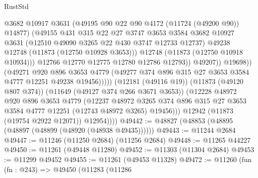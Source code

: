 \begin{lexlean}{RustStd}
\begin{coremodule}
                                  @3682
                                  @10917
                                  @3631
                                  (@49195 @90 @22 @90 @4172 (@11724 (@49200 @90)) @14877)
                                  (@49155
                                    @431
                                    @315
                                    @22
                                    @27
                                    @3747
                                    @3653
                                    @3584
                                    @3682
                                    @10927
                                    @3631
                                    (@12510 @49090 @3265 @22 @430 @3747 @12733 @12737)
                                    @49238
                                    @12748
                                    (@11873 (@12750 @10928 @3653)))
                                  @12748
                                  (@11873 (@12750 @10918 @10934)))
                                @12766
                                @12770
                                @12775
                                @12780
                                @12786
                                @12793))
                            @49207))
                        @19698))
                    (@49271
                      @920
                      @896
                      @3653
                      @4779
                      (@49277 @374 @896 @315 @27 @3653 @3584 @4777 @12251 @49238 @19456)))))
              (@12181 (@49116 @19))
              (@11873 (@49120 @807 @374))
              (@11649 (@49127 @374 @266 @3671 @3653))
              (@12228
                @48972
                @920
                @896
                @3653
                @4779
                (@12237
                  @48972
                  @3265
                  @374
                  @896
                  @315
                  @27
                  @3653
                  @3584
                  @4777
                  @12251
                  (@12743 @48972 @3265)
                  @19456)))
            @12942
            (@11873 (@19754 @2922 @12071))
            @12954))))
@49442 := @48827 (@48853 (@48895 (@48897 (@48899 (@48920 (@48938 @49435))))))
@49443 := @11244 @2684
@49447 := @11246 (@11250 @2684) (@11256 @2684)
@49448 := @11265 @44227
@49450 := @11261 (@49448 @11280)
@49452 := @11303 (@11304 @2684)
@49453 := @11299 @49452
@49455 := @11261 (@49453 @11328)
@49472 := @11260
    (fun (fn : @243) =>
    @49450
      (@11283
        (@11286

\end{coremodule}
\end{lexlean}
